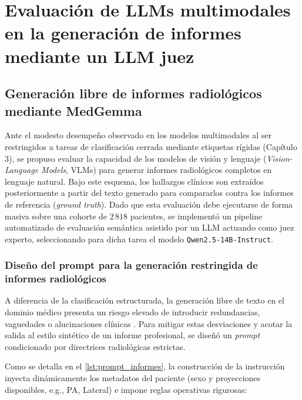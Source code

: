 \documentclass[../tesis.tex]{subfiles}
\begin{document}
\graphicspath{{../imagenes/}{imagenes/}}

\chapter{Evaluación de LLMs multimodales en la generación de informes mediante un LLM juez}
\label{cap:Capitulo4}

\section{Generación libre de informes radiológicos mediante MedGemma}
\label{sec:generacion_libre_medgemma}

Ante el modesto desempeño observado en los modelos multimodales al ser restringidos a tareas de clasificación cerrada mediante etiquetas rígidas (Capítulo 3), se propuso evaluar la capacidad de los modelos de visión y lenguaje (\textit{Vision-Language Models}, VLMs) para generar informes radiológicos completos en lenguaje natural. Bajo este esquema, los hallazgos clínicos son extraídos posteriormente a partir del texto generado para compararlos contra los informes de referencia (\textit{ground truth}). Dado que esta evaluación debe ejecutarse de forma masiva sobre una cohorte de $2\,818$ pacientes, se implementó un pipeline automatizado de evaluación semántica asistido por un LLM actuando como juez experto, seleccionando para dicha tarea el modelo \texttt{Qwen2.5-14B-Instruct}.

\subsection{Diseño del prompt para la generación restringida de informes radiológicos}
\label{subsec:prompt_informes}

A diferencia de la clasificación estructurada, la generación libre de texto en el dominio médico presenta un riesgo elevado de introducir redundancias, vaguedades o alucinaciones clínicas \citep{Artsi_et_al._2025} \citep{Doshi_et_al._2024}. Para mitigar estas desviaciones y acotar la salida al estilo sintético de un informe profesional, se diseñó un \textit{prompt} condicionado por directrices radiológicas estrictas.

Como se detalla en el \autoref{lst:prompt_informes}, la construcción de la instrucción inyecta dinámicamente los metadatos del paciente (sexo y proyecciones disponibles, e.g., PA, Lateral) e impone reglas operativas rigurosas:
\end{document}
